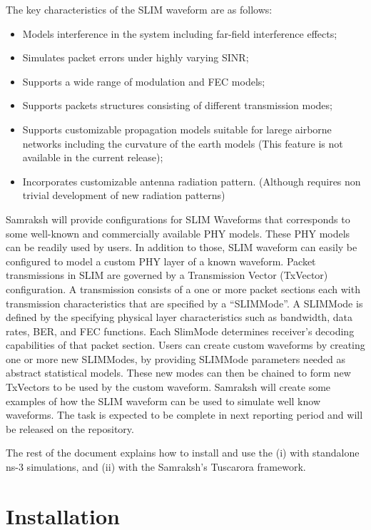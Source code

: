 The key characteristics of the SLIM waveform are as follows: 
\begin{itemize}
	\item Models interference in the system including far-field interference effects;
	\item Simulates packet errors under highly varying SINR; 
	\item Supports a wide range of modulation and FEC models;
	\item Supports packets structures consisting of different transmission modes;
	\item Supports customizable propagation models suitable for larege airborne networks including the curvature of the earth models (This feature is not available in the current release);
	\item Incorporates customizable antenna radiation pattern. (Although requires non trivial development of new radiation patterns)
\end{itemize}

Samraksh will provide configurations for SLIM Waveforms that corresponds to some well-known and commercially available PHY models. These PHY models can be readily used by users. In addition to those, SLIM waveform can easily be configured to model a custom PHY layer of a known waveform. Packet transmissions in SLIM are governed by a Transmission Vector (TxVector) configuration. A transmission  consists of a one or more packet sections each with transmission characteristics that are specified by a “SLIMMode”. A SLIMMode is defined by the specifying physical layer characteristics such as bandwidth, data rates, BER, and FEC functions. Each SlimMode determines receiver’s decoding capabilities of that packet section. Users can create custom waveforms by creating one or more new SLIMModes, by providing SLIMMode parameters needed as abstract statistical models. These new modes can then be chained to form new TxVectors to be used by the custom waveform. 
Samraksh will create some examples of how the SLIM waveform can be used to simulate well know waveforms. The task is expected to be complete in next reporting period and will be released on the repository.

The rest of the document explains how to install and use the  
(i) with standalone ns-3 simulations, and (ii) with the Samraksh's Tuscarora framework. 

\section{Installation} \label{sec:install}

